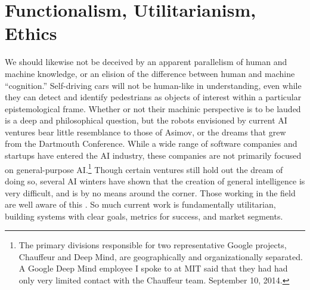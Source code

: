 \section{Functionalism, Utilitarianism, Ethics} 
We should likewise not be deceived by an apparent parallelism of human
and machine knowledge, or an elision of the difference between human
and machine ``cognition.'' Self-driving cars will not be human-like in
understanding, even while they can detect and identify pedestrians as
objects of interest within a particular epistemological frame. Whether
or not their machinic perspective is to be lauded is a deep and
philosophical question, but the robots envisioned by current AI
ventures bear little resemblance to those of Asimov, or the dreams that grew
from the Dartmouth Conference. While a wide range of software companies and
startups have entered the AI 
industry, these companies are not primarily focused on
general-purpose AI.\footnote{The primary divisions responsible for two
representative Google projects, Chauffeur and Deep Mind, are
geographically and organizationally separated. A Google Deep Mind
employee I spoke to at MIT said that they had had only very limited
contact with the Chauffeur team. September 10, 2014.} Though certain
ventures still hold out the dream 
of doing so, several AI winters have shown that the creation of
general intelligence is very difficult, and is by no means around the
corner. Those working in the field are well aware of
this \cite{sofgeAIFears}. So much current work is
fundamentally utilitarian, building systems with clear goals, metrics
for success, and market segments.

